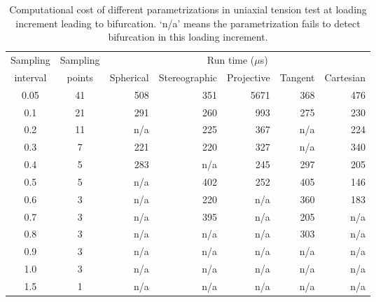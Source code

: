 \documentclass[12pt]{article}
\numberwithin{equation}{section}
\begin{document}
\begin{table}[H]
  \begin{center}
    \begin{tabular}{c c | r r r r r}
      \toprule
      Sampling   & Sampling &   \multicolumn{5}{c}{Run time ($\mu$s)}	\\   
      interval     & points     &  Spherical    &   Stereographic  &   Projective  &   Tangent   & Cartesian  \\
      \midrule         
      0.05      &      41     &      508     &    351        &       5671       &       368        &      476           \\
      0.1        &      21     &      291      &    260        &       993         &       275 &      230           \\
      0.2        &      11     &      n/a      &    225        &       367          &       n/a         &      224            \\
      0.3        &      7       &      221      &    220         &       327         &       n/a         &      340           \\
      0.4        &      5       &      283      &    n/a        &       245          &       297        &      205           \\       
      0.5        &      5       &	  n/a      &    402         &       252          &      405         &      146           \\
      0.6        &      3       &	  n/a      &    220         &       n/a         &       360        &      183           \\
      0.7        &      3       &	  n/a     &    395 	      &        n/a         &       205         &      n/a            \\
      0.8        &      3       &      n/a      &    n/a        &        n/a         &       303        &       n/a            \\	      
      0.9        &      3       &	  n/a      &    n/a         &        n/a         &       n/a        &       n/a         \\	
      1.0        &      3       &      n/a      &    n/a	      &       n/a          &       n/a        &       n/a          \\	
      1.5        &      1       &	  n/a      &    n/a	      &       n/a          &       n/a        &       n/a          \\	       
      \bottomrule
    \end{tabular}
    \caption{Computational cost of different parametrizations in 
    uniaxial tension test at loading increment leading to bifurcation. 
    `n/a' means the parametrization fails to detect bifurcation in 
    this loading increment.}
    \label{tab:aniso_uniaxial_runtime}
  \end{center}
\end{table}
\end{document}
